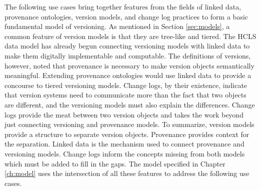 The following use cases bring together features from the fields of linked data, provenance ontologies, version models, and change log practices to form a basic fundamental model of versioning.
As mentioned in Section \ref{sec:models}, a common feature of version models is that they are tree-like and tiered.
The HCLS data model has already begun connecting versioning models with linked data to make them digitally implementable and computable.
The definitions of versions, however, noted that provenance is necessary to make version objects semantically meaningful.
Extending provenance ontologies would use linked data to provide a concourse to tiered versioning models.
Change logs, by their existence, indicate that version systems need to communicate more than the fact that two objects are different, and the versioning models must also explain the differences.
Change logs provide the meat between two version objects and takes the work beyond just connecting versioning and provenance models.
To summarize, version models provide a structure to separate version objects.
Provenance provides context for the separation.
Linked data is the mechanism used to connect provenance and versioning models.
Change logs inform the concepts missing from both models which must be added to fill in the gaps.
The model specified in Chapter \ref{ch:model} uses the intersection of all these features to address the following use cases.

